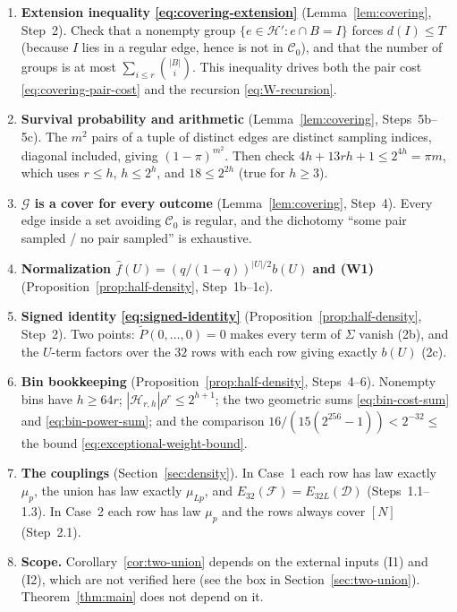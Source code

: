 \documentclass[11pt,letterpaper]{article}
\theoremstyle{definition}
\theoremstyle{remark}
\numberwithin{equation}{section}
\begin{document}
\begin{enumerate}
\item \textbf{Extension inequality \eqref{eq:covering-extension}}
(Lemma~\ref{lem:covering}, Step~2). Check that a nonempty group
$\{e\in\mathcal H':e\cap B=I\}$ forces $d(I)\le T$ (because $I$ lies in a
regular edge, hence is not in $\mathcal C_0$), and that the number of
groups is at most $\sum_{i\le r}\binom{|B|}{i}$. This inequality drives
both the pair cost \eqref{eq:covering-pair-cost} and the recursion
\eqref{eq:W-recursion}.
\item \textbf{Survival probability and arithmetic}
(Lemma~\ref{lem:covering}, Steps~5b--5c). The $m^2$ pairs of a tuple of
distinct edges are distinct sampling indices, diagonal included, giving
$(1-\pi)^{m^2}$. Then check $4h+13rh+1\le2^{4h}=\pi m$, which uses
$r\le h$, $h\le2^h$, and $18\le2^{2h}$ (true for $h\ge3$).
\item \textbf{$\mathcal G$ is a cover for every outcome}
(Lemma~\ref{lem:covering}, Step~4). Every edge inside a set avoiding
$\mathcal C_0$ is regular, and the dichotomy ``some pair sampled / no pair
sampled'' is exhaustive.
\item \textbf{Normalization
$\widehat f(U)=(q/(1-q))^{|U|/2}b(U)$ and (W1)}
(Proposition~\ref{prop:half-density}, Step~1b--1c).
\item \textbf{Signed identity \eqref{eq:signed-identity}}
(Proposition~\ref{prop:half-density}, Step~2). Two points:
$\widetilde P(0,\ldots,0)=0$ makes every term of $\Sigma$ vanish (2b),
and the $U$-term factors over the $32$ rows with each row giving exactly
$b(U)$ (2c).
\item \textbf{Bin bookkeeping}
(Proposition~\ref{prop:half-density}, Steps~4--6). Nonempty bins have
$h\ge64r$; $|\mathcal H_{r,h}|\rho^r\le2^{h+1}$; the two geometric sums
\eqref{eq:bin-cost-sum} and \eqref{eq:bin-power-sum}; and the comparison
$16/(15(2^{256}-1))<2^{-32}\le$ the bound
\eqref{eq:exceptional-weight-bound}.
\item \textbf{The couplings} (Section~\ref{sec:density}). In Case~1 each
row has law exactly $\mu_p$, the union has law exactly $\mu_{Lp}$, and
$E_{32}(\mathcal F)=E_{32L}(\mathcal D)$ (Steps~1.1--1.3). In Case~2 each
row has law $\mu_p$ and the rows always cover $[N]$ (Step~2.1).
\item \textbf{Scope.} Corollary~\ref{cor:two-union} depends on the
external inputs (I1) and (I2), which are not verified here (see the box in
Section~\ref{sec:two-union}). Theorem~\ref{thm:main} does not depend on
it.
\end{enumerate}
\end{document}
